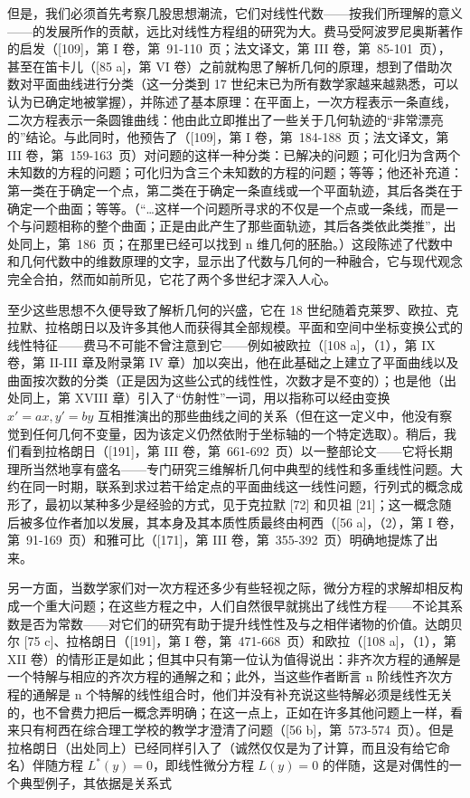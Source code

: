 但是，我们必须首先考察几股思想潮流，它们对线性代数——按我们所理解的意义——的发展所作的贡献，远比对线性方程组的研究为大。费马受阿波罗尼奥斯著作的启发（{[}109{]}，第 I 卷，第~91-110~页；法文译文，第 III 卷，第~85-101~页），甚至在笛卡儿（{[}85 a{]}，第 VI 卷）之前就构思了解析几何的原理，想到了借助次数对平面曲线进行分类（这一分类到 17 世纪末已为所有数学家越来越熟悉，可以认为已确定地被掌握），并陈述了基本原理：在平面上，一次方程表示一条直线，二次方程表示一条圆锥曲线：他由此立即推出了一些关于几何轨迹的“非常漂亮的”结论。与此同时，他预告了（{[}109{]}，第 I 卷，第~184-188~页；法文译文，第 III 卷，第~159-163~页）对问题的这样一种分类：已解决的问题；可化归为含两个未知数的方程的问题；可化归为含三个未知数的方程的问题；等等；他还补充道：第一类在于确定一个点，第二类在于确定一条直线或一个平面轨迹，其后各类在于确定一个曲面；等等。（“\ldots 这样一个问题所寻求的不仅是一个点或一条线，而是一个与问题相称的整个曲面；正是由此产生了那些面轨迹，其后各类依此类推”，出处同上，第~186~页；在那里已经可以找到 n 维几何的胚胎。）这段陈述了代数中和几何代数中的维数原理的文字，显示出了代数与几何的一种融合，它与现代观念完全合拍，然而如前所见，它花了两个多世纪才深入人心。

至少这些思想不久便导致了解析几何的兴盛，它在 18 世纪随着克莱罗、欧拉、克拉默、拉格朗日以及许多其他人而获得其全部规模。平面和空间中坐标变换公式的线性特征——费马不可能不曾注意到它——例如被欧拉（{[}108 a{]}，（1），第 IX 卷，第 II-III 章及附录第 IV 章）加以突出，他在此基础之上建立了平面曲线以及曲面按次数的分类（正是因为这些公式的线性性，次数才是不变的）；也是他（出处同上，第 XVIII 章）引入了“仿射性”一词，用以指称可以经由变换 \(x' = ax, y' = by\) 互相推演出的那些曲线之间的关系（但在这一定义中，他没有察觉到任何几何不变量，因为该定义仍然依附于坐标轴的一个特定选取）。稍后，我们看到拉格朗日（{[}191{]}，第 III 卷，第~661-692~页）以一整部论文——它将长期理所当然地享有盛名——专门研究三维解析几何中典型的线性和多重线性问题。大约在同一时期，联系到求过若干给定点的平面曲线这一线性问题，行列式的概念成形了，最初以某种多少是经验的方式，见于克拉默 {[}72{]} 和贝祖 {[}21{]}；这一概念随后被多位作者加以发展，其本身及其本质性质最终由柯西（{[}56 a{]}，（2），第 I 卷，第~91-169~页）和雅可比（{[}171{]}，第 III 卷，第~355-392~页）明确地提炼了出来。

另一方面，当数学家们对一次方程还多少有些轻视之际，微分方程的求解却相反构成一个重大问题；在这些方程之中，人们自然很早就挑出了线性方程——不论其系数是否为常数——对它们的研究有助于提升线性性及与之相伴诸物的价值。达朗贝尔 {[}75 c{]}、拉格朗日（{[}191{]}，第 I 卷，第~471-668~页）和欧拉（{[}108 a{]}，（1），第 XII 卷）的情形正是如此；但其中只有第一位认为值得说出：非齐次方程的通解是一个特解与相应的齐次方程的通解之和；此外，当这些作者断言 n 阶线性齐次方程的通解是 n 个特解的线性组合时，他们并没有补充说这些特解必须是线性无关的，也不曾费力把后一概念弄明确；在这一点上，正如在许多其他问题上一样，看来只有柯西在综合理工学校的教学才澄清了问题（{[}56 b{]}，第~573-574~页）。但是拉格朗日（出处同上）已经同样引入了（诚然仅仅是为了计算，而且没有给它命名）伴随方程 \(L^{*}(y) = 0\)，即线性微分方程 \(L(y) = 0\) 的伴随，这是对偶性的一个典型例子，其依据是关系式

